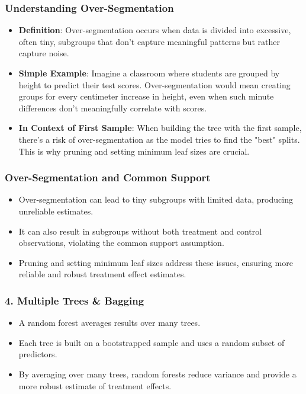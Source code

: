 \documentclass{beamer}
\begin{document}
\begin{frame}
\frametitle{Understanding Over-Segmentation}
\begin{itemize}
\item \textbf{Definition}: Over-segmentation occurs when data is divided into excessive, often tiny, subgroups that don't capture meaningful patterns but rather capture noise.
\item \textbf{Simple Example}: Imagine a classroom where students are grouped by height to predict their test scores. Over-segmentation would mean creating groups for every centimeter increase in height, even when such minute differences don't meaningfully correlate with scores.
\item \textbf{In Context of First Sample}: When building the tree with the first sample, there's a risk of over-segmentation as the model tries to find the "best" splits. This is why pruning and setting minimum leaf sizes are crucial.
\end{itemize}
\end{frame}



\begin{frame}
\frametitle{Over-Segmentation and Common Support}
\begin{itemize}
\item Over-segmentation can lead to tiny subgroups with limited data, producing unreliable estimates.
\item It can also result in subgroups without both treatment and control observations, violating the common support assumption.
\item Pruning and setting minimum leaf sizes address these issues, ensuring more reliable and robust treatment effect estimates.
\end{itemize}
\end{frame}



\begin{frame}
\frametitle{4. Multiple Trees \& Bagging}
\begin{itemize}
\item A random forest averages results over many trees.
\item Each tree is built on a bootstrapped sample and uses a random subset of predictors.
\item By averaging over many trees, random forests reduce variance and provide a more robust estimate of treatment effects.
\end{itemize}
\end{frame}
\end{document}
